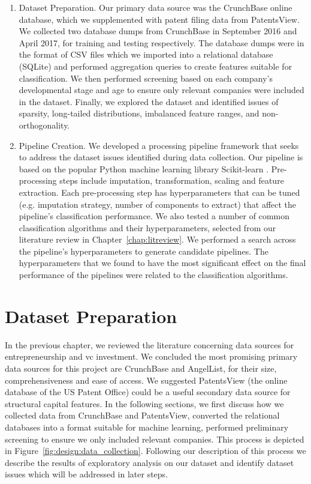 \documentclass[../thesis/thesis.tex]{subfiles}
\begin{document}
\begin{enumerate}

\item Dataset Preparation. Our primary data source was the CrunchBase online database, which we supplemented with patent filing data from PatentsView. We collected two database dumps from CrunchBase in September 2016 and April 2017, for training and testing respectively. The database dumps were in the format of CSV files which we imported into a relational database (SQLite) and performed aggregation queries to create features suitable for classification. We then performed screening based on each company's developmental stage and age to ensure only relevant companies were included in the dataset. Finally, we explored the dataset and identified issues of sparsity, long-tailed distributions, imbalanced feature ranges, and non-orthogonality.

\item Pipeline Creation. We developed a processing pipeline framework that seeks to address the dataset issues identified during data collection. Our pipeline is based on the popular Python machine learning library Scikit-learn \cite{pedregosa2011}. Pre-processing steps include imputation, transformation, scaling and feature extraction. Each pre-processing step has hyperparameters that can be tuned (e.g. imputation strategy, number of components to extract) that affect the pipeline's classification performance. We also tested a number of common classification algorithms and their hyperparameters, selected from our literature review in Chapter~\ref{chap:litreview}. We performed a search across the pipeline's hyperparameters to generate candidate pipelines. The hyperparameters that we found to have the most significant effect on the final performance of the pipelines were related to the classification algorithms.

\end{enumerate}

\section{Dataset Preparation}

In the previous chapter, we reviewed the literature concerning data sources for entrepreneurship and \gls{vc} investment. We concluded the most promising primary data sources for this project are CrunchBase and AngelList, for their size, comprehensiveness and ease of access. We suggested PatentsView (the online database of the US Patent Office) could be a useful secondary data source for structural capital features. In the following sections, we first discuss how we collected data from CrunchBase and PatentsView, converted the relational databases into a format suitable for machine learning, performed preliminary screening to ensure we only included relevant companies. This process is depicted in Figure~\ref{fig:design:data_collection}. Following our description of this process we describe the results of exploratory analysis on our dataset and identify dataset issues which will be addressed in later steps.
\end{document}
